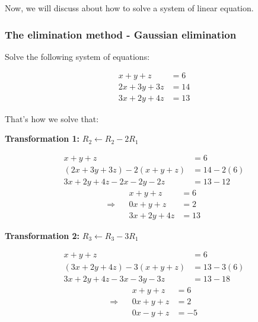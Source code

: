\documentclass[a4paper,12pt]{article}
\begin{document}
\small Now, we will discuss about how to solve a system of linear equation.
\Large \subsubsection{The elimination method - Gaussian elimination}
    \begin{frame}
        
    

    \small  %

    Solve the following system of equations:

    \[
    \begin{aligned}
        x + y + z &= 6 \\
        2x + 3y + 3z &= 14 \\
        3x + 2y + 4z &= 13
    \end{aligned}
    \]

    \small That's how we solve that:

    \textbf{Transformation 1:} \( R_2 \leftarrow R_2 - 2R_1 \)

    \[
    \begin{aligned}
        x + y + z &= 6 \\
        (2x + 3y + 3z) - 2(x + y + z) &= 14 - 2(6) \\
        3x + 2y + 4z - 2x - 2y - 2z &= 13 - 12
    \end{aligned}
    \]
    \[
    \Rightarrow
    \quad \begin{aligned}
        x + y + z &= 6 \\
        0x + y + z &= 2 \\
        3x + 2y + 4z &= 13
    \end{aligned}
    \]
    
    \textbf{Transformation 2:} \( R_3 \leftarrow R_3 - 3R_1 \)
    
    \[
    \begin{aligned}
        x + y + z &= 6 \\
        (3x + 2y + 4z) - 3(x + y + z) &= 13 - 3(6) \\
        3x + 2y + 4z - 3x - 3y - 3z &= 13 - 18
    \end{aligned}
    \]
    \[
    \Rightarrow
    \quad \begin{aligned}
        x + y + z &= 6 \\
        0x + y + z &= 2 \\
        0x - y + z &= -5
    \end{aligned}
    \]
    

\end{frame}
\end{document}
